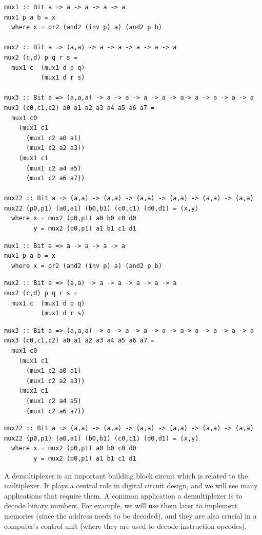\documentclass[]{svmono}
\begin{document}
\begin{verbatim}
mux1 :: Bit a => a -> a -> a -> a
mux1 p a b = x
  where x = or2 (and2 (inv p) a) (and2 p b)

mux2 :: Bit a => (a,a) -> a -> a -> a -> a -> a
mux2 (c,d) p q r s =
  mux1 c  (mux1 d p q)
          (mux1 d r s)

mux3 :: Bit a => (a,a,a) -> a -> a -> a -> a -> a-> a -> a -> a -> a
mux3 (c0,c1,c2) a0 a1 a2 a3 a4 a5 a6 a7 =
  mux1 c0
    (mux1 c1
      (mux1 c2 a0 a1)
      (mux1 c2 a2 a3))
    (mux1 c1
      (mux1 c2 a4 a5)
      (mux1 c2 a6 a7))

mux22 :: Bit a => (a,a) -> (a,a) -> (a,a) -> (a,a) -> (a,a) -> (a,a)
mux22 (p0,p1) (a0,a1) (b0,b1) (c0,c1) (d0,d1) = (x,y)
  where x = mux2 (p0,p1) a0 b0 c0 d0
        y = mux2 (p0,p1) a1 b1 c1 d1
\end{verbatim}


\begin{verbatim}
mux1 :: Bit a => a -> a -> a -> a
mux1 p a b = x
  where x = or2 (and2 (inv p) a) (and2 p b)
\end{verbatim}


\begin{verbatim}
mux2 :: Bit a => (a,a) -> a -> a -> a -> a -> a
mux2 (c,d) p q r s =
  mux1 c  (mux1 d p q)
          (mux1 d r s)
\end{verbatim}



\begin{verbatim}
mux3 :: Bit a => (a,a,a) -> a -> a -> a -> a -> a-> a -> a -> a -> a
mux3 (c0,c1,c2) a0 a1 a2 a3 a4 a5 a6 a7 =
  mux1 c0
    (mux1 c1
      (mux1 c2 a0 a1)
      (mux1 c2 a2 a3))
    (mux1 c1
      (mux1 c2 a4 a5)
      (mux1 c2 a6 a7))
\end{verbatim}



\begin{verbatim}
mux22 :: Bit a => (a,a) -> (a,a) -> (a,a) -> (a,a) -> (a,a) -> (a,a)
mux22 (p0,p1) (a0,a1) (b0,b1) (c0,c1) (d0,d1) = (x,y)
  where x = mux2 (p0,p1) a0 b0 c0 d0
        y = mux2 (p0,p1) a1 b1 c1 d1
\end{verbatim}


A demultiplexer is an important building block circuit which is
related to the multiplexer.  It plays a central role in digital
circuit design, and we will see many applications that require them.
A common application a demultiplexer is to decode binary numbers.  For
example, we will use them later to implement memories (since the
address needs to be decoded), and they are also crucial in a
computer's control unit (where they are used to decode instruction
opcodes).
\end{document}
